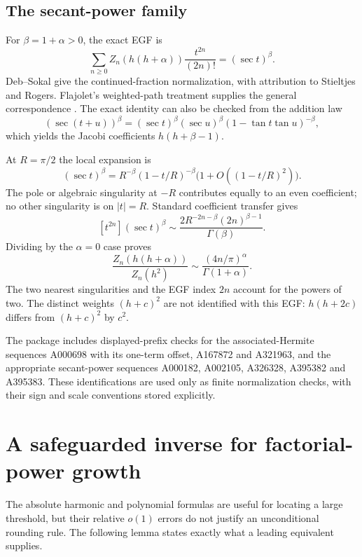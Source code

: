 \documentclass[11pt,letterpaper]{article}
\numberwithin{equation}{section}
\theoremstyle{remark}\newtheorem{remark}[theorem]{Remark}
\begin{document}
\subsection{The secant-power family}
For $\beta=1+\alpha>0$, the exact EGF is
\begin{equation}\label{pwd:hm:eq:secant-EGF}
 \sum_{n\ge0}Z_n(h(h+\alpha))\frac{t^{2n}}{(2n)!}=(\sec t)^\beta.
\end{equation}
Deb--Sokal \cite[Section 6.3, Eq. (6.24a) at $k=0$]{debsokal} give the continued-fraction normalization, with attribution to Stieltjes and Rogers. Flajolet's weighted-path treatment supplies the general correspondence \cite{flajolet}. The exact identity can also be checked from the addition law
\[
 (\sec(t+u))^\beta=(\sec t)^\beta(\sec u)^\beta
 (1-\tan t\tan u)^{-\beta},
\]
which yields the Jacobi coefficients $h(h+\beta-1)$.

At $R=\pi/2$ the local expansion is
\[
 (\sec t)^\beta=R^{-\beta}(1-t/R)^{-\beta}
 \bigl(1+O((1-t/R)^2)\bigr).
\]
The pole or algebraic singularity at $-R$ contributes equally to an even coefficient; no other singularity is on $|t|=R$. Standard coefficient transfer gives
\[
 [t^{2n}](\sec t)^\beta\sim
 \frac{2R^{-2n-\beta}(2n)^{\beta-1}}{\Gamma(\beta)}.
\]
Dividing by the $\alpha=0$ case proves
\begin{equation}\label{pwd:hm:eq:secant-ratio}
 \frac{Z_n(h(h+\alpha))}{Z_n(h^2)}\sim
 \frac{(4n/\pi)^\alpha}{\Gamma(1+\alpha)}.
\end{equation}
The two nearest singularities and the EGF index $2n$ account for the powers of two. The distinct weights $(h+c)^2$ are not identified with this EGF: $h(h+2c)$ differs from $(h+c)^2$ by $c^2$.

The package includes displayed-prefix checks for the associated-Hermite sequences A000698 with its one-term offset, A167872 and A321963, and the appropriate secant-power sequences A000182, A002105, A326328, A395382 and A395383. These identifications are used only as finite normalization checks, with their sign and scale conventions stored explicitly.

\section{A safeguarded inverse for factorial-power growth}\label{pwd:hm:sec:inverse}
The absolute harmonic and polynomial formulas are useful for locating a large threshold, but their relative $o(1)$ errors do not justify an unconditional rounding rule. The following lemma states exactly what a leading equivalent supplies.
\end{document}
